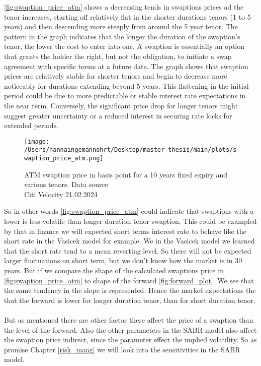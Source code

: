 \noindent
\autoref{fig:swaption_price_atm} shows a decreasing tends in swaptions prices ad the tenor increases,
starting off relatively flat in the shorter durations tenors (1 to 5 years) and then 
descending more steeply from around the 5 year tenor. 
The pattern in the graph indicates that the longer the duration of the swaption's tenor, 
the lower the cost to enter into one. A swaption is essentially an option that grants the 
holder the right, but not the obligation, to initiate a swap agreement with specific terms at a future date. 
The graph shows that swaption prices are relatively stable for shorter tenors and begin to 
decrease more noticeably for durations extending beyond 5 years. 
This flattening in the initial period could be due to more predictable or stable interest 
rate expectations in the near term. Conversely, the significant price drop for longer 
tenors might suggest greater uncertainty or a reduced interest in securing rate locks for extended periods.
\begin{figure}[H]
    \centering
    \texttt{[image: /Users/nannaingemannohrt/Desktop/master\_thesis/main/plots/swaption\_price\_atm.png]}
    \caption{ATM swaption price in basis point for a 10 years fixed expiry and various tenors.
    Data source  \\ Citi Velocity 21.02.2024}
    \label{fig:swaption_price_atm}
\end{figure}
\noindent
So in other words \autoref{fig:swaption_price_atm}  could indicate that swaptions with a lower is less
volatile than longer duration tenor swaption. This could be exampled by that in finance we will 
expected short terms interest rate to behave like the short rate in the Vasicek model for example. 
We in the Vasicek model we learned that the short rate tend to a mean reverting level. 
So there will not be expected larger fluctuations on short term, but we don't know how the market is in 
30 years. But if we compare the shape of the calculated swaptions price in \autoref{fig:swaption_price_atm} 
to shape of the forward \autoref{fig:forward_plot}. We see that the same tendency in the slope 
is represented. Hence the market expectations the that the forward is lower for longer duration tenor, 
than for short duration tenor. 
\\\\
But as mentioned there are other factor there affect the price of a swaption than the level of the forward. 
Also the other parameters in the SABR model also affect the swaption price indirect, 
since the parameter effect the implied volatility. 
So as promise Chapter \ref{risk_mang} we will look into the sensitivities in the SABR model.
